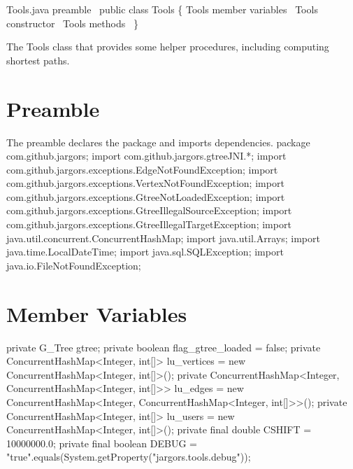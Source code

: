 \nwenddocs{}\endmoddef{}
\LA{}Tools.java preamble~{\nwtagstyle{}}\RA{}
public class Tools \{
  \LA{}\code{}Tools\edoc{} member variables~{\nwtagstyle{}}\RA{}
  \LA{}\code{}Tools\edoc{} constructor~{\nwtagstyle{}}\RA{}
  \LA{}\code{}Tools\edoc{} methods~{\nwtagstyle{}}\RA{}
\}
\nwendcode{}\nwdocspar

The Tools class that provides some helper procedures, including computing
shortest paths.

\section{Preamble}
The preamble declares the package and imports dependencies.
\nwenddocs{}\endmoddef{}
package com.github.jargors;
import com.github.jargors.gtreeJNI.*;
import com.github.jargors.exceptions.EdgeNotFoundException;
import com.github.jargors.exceptions.VertexNotFoundException;
import com.github.jargors.exceptions.GtreeNotLoadedException;
import com.github.jargors.exceptions.GtreeIllegalSourceException;
import com.github.jargors.exceptions.GtreeIllegalTargetException;
import java.util.concurrent.ConcurrentHashMap;
import java.util.Arrays;
import java.time.LocalDateTime;
import java.sql.SQLException;
import java.io.FileNotFoundException;
\nwendcode{}\nwdocspar

\section{Member Variables}
\nwenddocs{}\endmoddef{}
private G_Tree gtree;
private boolean flag_gtree_loaded = false;
private ConcurrentHashMap<Integer, int[]> lu_vertices = new ConcurrentHashMap<Integer, int[]>();
private ConcurrentHashMap<Integer,
    ConcurrentHashMap<Integer, int[]>>    lu_edges    = new ConcurrentHashMap<Integer, ConcurrentHashMap<Integer, int[]>>();
private ConcurrentHashMap<Integer, int[]> lu_users    = new ConcurrentHashMap<Integer, int[]>();
private final double CSHIFT = 10000000.0;
private final boolean DEBUG = "true".equals(System.getProperty("jargors.tools.debug"));
\nwendcode{}\nwdocspar

